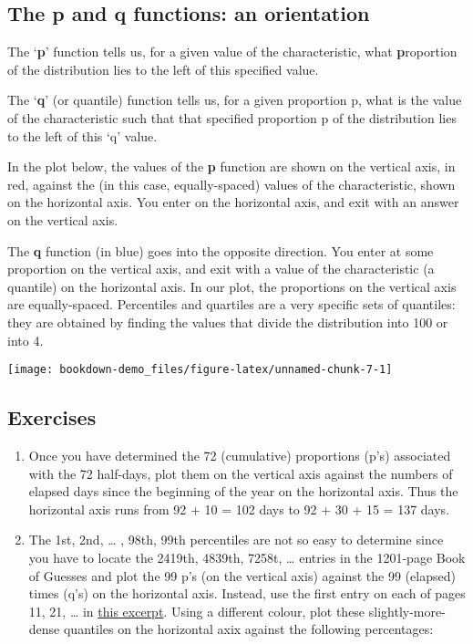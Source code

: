 \documentclass[]{book}
\begin{document}
\hypertarget{the-p-and-q-functions-an-orientation}{%
\subsection{The p and q functions: an orientation}\label{the-p-and-q-functions-an-orientation}}

The `\textbf{p}' function tells us, for a given value of the characteristic, what \textbf{p}roportion of the distribution lies to the left of this specified value.

The `\textbf{q}' (or quantile) function tells us, for a given proportion p, what is the value of the characteristic such that that specified proportion p of the distribution lies to the left of this `q' value.

In the plot below, the values of the \textbf{p} function are shown on the vertical axis, in red, against the (in this case, equally-spaced) values of the characteristic, shown on the horizontal axis. You enter on the horizontal axis, and exit with an answer on the vertical axis.

The \textbf{q} function (in blue) goes into the opposite direction. You enter at some proportion on the vertical axis, and exit with a value of the characteristic (a quantile) on the horizontal axis. In our plot, the proportions on the vertical axis are equally-spaced. Percentiles and quartiles are a very specific sets of quantiles: they are obtained by finding the values that divide the distribution into 100 or into 4.

\begin{center}\texttt{[image: bookdown-demo\_files/figure-latex/unnamed-chunk-7-1]} \end{center}

\hypertarget{exercises-1}{%
\subsection{Exercises}\label{exercises-1}}

\begin{enumerate}
\def\labelenumi{\arabic{enumi}.}
\item
  Once you have determined the 72 (cumulative) proportions (p's) associated with the 72 half-days, plot them on the vertical axis against the numbers of elapsed days since the beginning of the year on the horizontal axis. Thus the horizontal axis runs from 92 + 10 = 102 days to 92 + 30 + 15 = 137 days.
\item
  The 1st, 2nd, \ldots{} , 98th, 99th percentiles are not so easy to determine since you have to locate the 2419th, 4839th, 7258t, \ldots{} entries in the 1201-page Book of Guesses and plot the 99 p's (on the vertical axis) against the 99 (elapsed) times (q's) on the horizontal axis. Instead, use the first entry on each of pages 11, 21, \ldots{} in
  \href{http://www.biostat.mcgill.ca/hanley/bios691/SampledPages.pdf}{this excerpt}. Using a different colour, plot these slightly-more-dense quantiles on the horizontal axix against the following percentages:
\end{enumerate}
\end{document}
